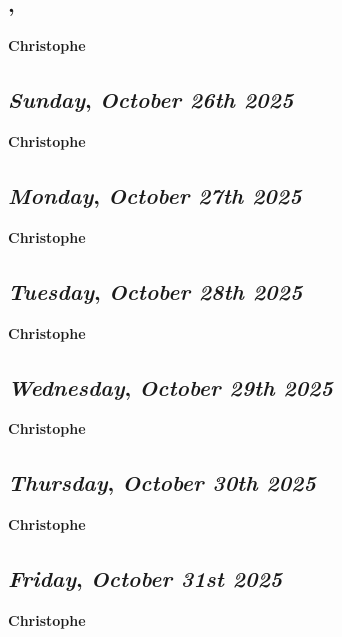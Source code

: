 \subsection*{\weekday, \day}
\textbf {Christophe}

\def\day{\textit{October 26th 2025}}
\def\weekday{\textit{Sunday}}
\subsection*{\weekday, \day}
\textbf {Christophe}

\def\day{\textit{October 27th 2025}}
\def\weekday{\textit{Monday}}
\subsection*{\weekday, \day}
\textbf {Christophe}

\def\day{\textit{October 28th 2025}}
\def\weekday{\textit{Tuesday}}
\subsection*{\weekday, \day}
\textbf {Christophe}

\def\day{\textit{October 29th 2025}}
\def\weekday{\textit{Wednesday}}
\subsection*{\weekday, \day}
\textbf {Christophe}

\def\day{\textit{October 30th 2025}}
\def\weekday{\textit{Thursday}}
\subsection*{\weekday, \day}
\textbf {Christophe}

\def\day{\textit{October 31st 2025}}
\def\weekday{\textit{Friday}}
\subsection*{\weekday, \day}
\textbf {Christophe}
